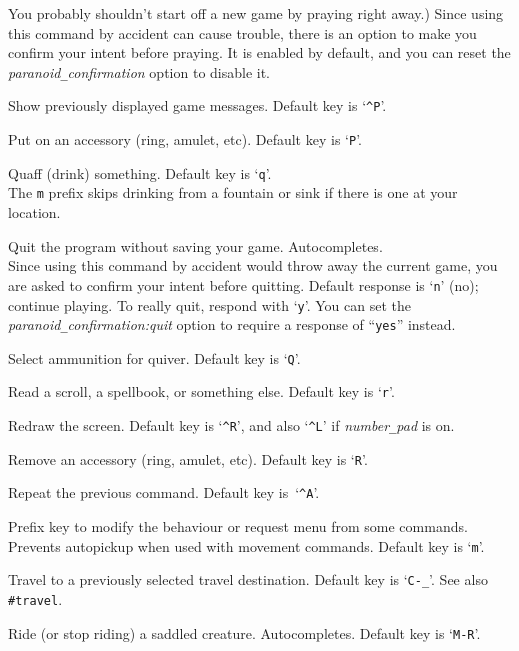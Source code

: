 You probably shouldn't start off a new game by praying right away.)
Since using this command by accident can cause trouble, there is an
option to make you confirm your intent before praying.  It is enabled
by default, and you can reset the
{\it paranoid\verb+_+confirmation\/}
option to disable it.
\item[\tb{\#prevmsg}]
Show previously displayed game messages. Default key is `{\tt \^{}P}'.
\item[\tb{\#puton}]
Put on an accessory (ring, amulet, etc). Default key is `{\tt P}'.
\item[\tb{\#quaff}]
Quaff (drink) something. Default key is `{\tt q}'.\\
The {\tt m} prefix skips drinking from a fountain or sink if there
is one at your location.
\item[\tb{\#quit}]
Quit the program without saving your game. Autocompletes.\\
Since using this command by accident would throw away the current game,
you are asked to confirm your intent before quitting.
Default response is `{\tt n}' (no); continue playing.
To really quit, respond with `{\tt y}'.
You can set the
{\it paranoid\verb+_+confirmation:quit\/}
option to require a response of ``{\tt yes}'' instead.
\item[\tb{\#quiver}]
Select ammunition for quiver. Default key is `{\tt Q}'.
\item[\tb{\#read}]
Read a scroll, a spellbook, or something else. Default key is `{\tt r}'.
\item[\tb{\#redraw}]
Redraw the screen.
Default key is `{\tt \^{}R}',
and also `{\tt \^{}L}' if {\it number\verb+_+pad\/} is on.
\item[\tb{\#remove}]
Remove an accessory (ring, amulet, etc). Default key is `{\tt R}'.
\item[{\bb{\#repeat}}]
Repeat the previous command.
Default key is~`{\tt \^{}A}'.
\item[\tb{\#reqmenu}]
Prefix key to modify the behaviour or request menu from some commands.
Prevents autopickup when used with movement commands.
Default key is `{\tt m}'.
\item[\tb{\#retravel}]
Travel to a previously selected travel destination.
Default key is `{\tt C-\verb+_+}'.
See also {\tt \#travel}.
\item[\tb{\#ride}]
Ride (or stop riding) a saddled creature. Autocompletes.
Default key is `{\tt M-R}'.
\item[\tb{\#rub}]
